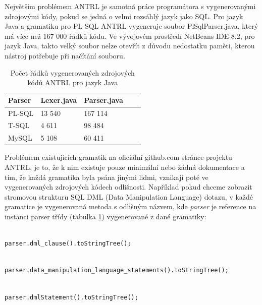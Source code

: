 \documentclass[czech,bachelor,public,dept460,male,cpdeclaration,twoside]{diploma}
\begin{document}
Největším problémem ANTRL je samotná práce programátora s vygenerovanými zdrojovými kódy, pokud se jedná o velmi rozsáhlý jazyk jako SQL. Pro jazyk Java a gramatiku pro PL-SQL ANTRL vygeneruje soubor PlSqlParser.java, který má více než 167 000 řádků kódu. Ve vývojovém prostředí NetBeans IDE 8.2, pro jazyk Java, takto velký soubor nelze otevřít z důvodu nedostatku paměti, kterou nástroj potřebuje při načítání souboru.

\begin{table}[!htbp]
	\centering
	\caption{Počet řádků vygenerovaných zdrojových kódů ANTRL pro jazyk Java}
	\label{tab:parsers}
	\begin{tabular}{lllll}
		\toprule
		Parser & Lexer.java & Parser.java\\
		\midrule
		PL-SQL & 13 540 & 167 114 \\
        T-SQL & 4 611 & 98 484 \\
        MySQL & 5 108 & 60 411 \\
		\midrule
	\end{tabular}
\end{table}


Problémem existujících gramatik na oficiální github.com stránce projektu ANTRL, je to, že k nim existuje pouze minimální nebo žádná dokumentace a tím, že každá gramatika byla psána jinými lidmi, vznikají poté ve vygenerovaných zdrojových kódech odlišnosti. Například pokud chceme zobrazit stromovou strukturu SQL DML (Data Manipulation Language) dotazu, v každé gramatice je vygenerovaná metoda s odlišným názvem, kde \textit{parser} je reference na instanci parser třídy (tabulka \ref{tab:parsers}) vygenerované z dané gramatiky:\newline

\begin{lstlisting}[caption=T-SQL Parser]

parser.dml_clause().toStringTree();
\end{lstlisting}

\begin{lstlisting}[caption=PL-SQL Parser]

parser.data_manipulation_language_statements().toStringTree();
\end{lstlisting}

\begin{lstlisting}[caption=MySQL Parser]

parser.dmlStatement().toStringTree();
\end{lstlisting}

\newpage
\end{document}

